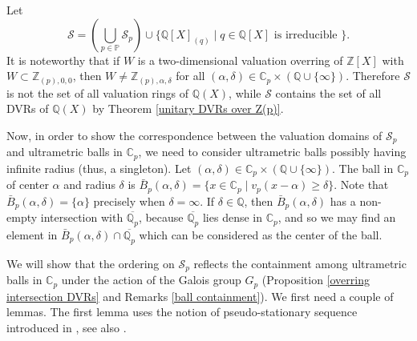 \documentclass[10pt]{article}
\numberwithin{equation}{section}
\theoremstyle{definition}
\theoremstyle{definition}
\newcommand{\Q}{\mathbb{Q}}
\newcommand{\Z}{\mathbb{Z}}
\newcommand{\C}{\mathbb{C}}
\newcommand{\PP}{\mathbb{P}}
\newcommand{\oQp}{\overline{\Q_p}}
\newcommand\ec { \color{black}}
\begin{document}

Let 
$$\mathcal{S} = (\bigcup\limits_{p \in \PP} \mathcal{S}_p) \cup \{\Q[X]_{(q)} \mid q \in \Q[X] \text{ is irreducible }\}.$$
It is noteworthy that if $W$ is a two-dimensional valuation overring of $\Z[X]$ with $W \subset \Z_{(p),0,0}$, then $W \neq \Z_{(p), \alpha, \delta}$ for all $(\alpha,\delta)\in\C_p \times(\Q\cup\{\infty\})$. Therefore $\mathcal{S}$ is not the set of all valuation rings of $\Q(X)$, while $\mathcal{S}$ contains the set of all DVRs of $\Q(X)$ by Theorem \ref{unitary DVRs over Z(p)}.

Now, in order to show the correspondence between the valuation domains of $\mathcal{S}_p$ and ultrametric balls  in $\C_p$, we need to consider ultrametric balls possibly having infinite radius (thus, a singleton). Let $(\alpha,\delta)\in\C_p\times(\Q\cup\{\infty\})$. The ball in $\C_p$ of center $\alpha$ and radius $\delta$ is $\bar B_p(\alpha,\delta)=\{x\in\C_p\mid v_p(x-\alpha)\geq\delta\}$. Note that $\bar B_p(\alpha,\delta)=\{\alpha\}$ precisely when $\delta=\infty$. If $\delta\in\Q$, 
then $\bar B_p(\alpha,\delta)$ has a non-empty intersection with $\oQp$, because $\oQp$ lies dense in $\C_p$, and so we may find an element in  $\bar B_p(\alpha,\delta)\cap\oQp$ which can be considered as the center of the ball.

We will show that the ordering on $\mathcal{S}_p$ reflects the containment among ultrametric balls in $\C_p$ under the action of the Galois group $G_p$ (Proposition \ref{overring intersection DVRs} and Remarks \ref{ball containment}).
We first need a couple of lemmas. The first lemma uses the notion of pseudo-stationary sequence introduced in \cite{ChabPolCloVal}, see also \cite{PerPrufer}.
\end{document}
